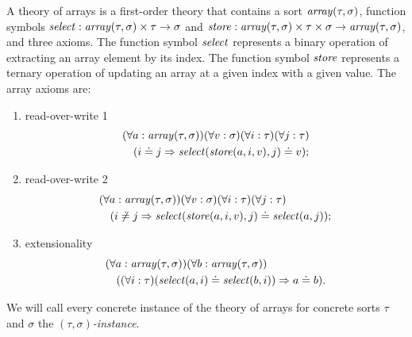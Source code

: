 A theory of arrays is a first-order theory that contains a sort
$\mathit{array}(\tau,\sigma)$, function symbols $\mathit{select} :
\mathit{array}(\tau,\sigma) \times \tau \to \sigma$ and $\mathit{store} :
\mathit{array}(\tau,\sigma) \times \tau \times \sigma \to
\mathit{array}(\tau,\sigma)$, and three axioms.
The function symbol $\mathit{select}$ represents a binary operation of
extracting an array element by its index.
The function symbol $\mathit{store}$ represents a ternary operation of updating an array at a given index with a given value. The array axioms are:
\begin{enumerate}
  \item read-over-write 1
        \begin{align*}
          &(\forall a:\mathit{array}(\tau,\sigma))(\forall v:\sigma)(\forall i:\tau)(\forall j:\tau)\\
          &\quad(i \doteq j \Rightarrow \mathit{select}({\mathit{store}({a},\allowbreak{i},\allowbreak{v})},\allowbreak{j}) \doteq v);
        \end{align*}
  \item read-over-write 2
        \begin{align*}
          &(\forall a:\mathit{array}(\tau,\sigma))(\forall v:\sigma)(\forall i:\tau)(\forall j:\tau)\\
          &\quad(i \not\doteq j \Rightarrow \mathit{select}({\mathit{store}({a},\allowbreak{i},\allowbreak{v})},\allowbreak{j}) \doteq \mathit{select}({a},\allowbreak{j}));
        \end{align*}
  \item extensionality
        \begin{align*}
          &(\forall a:\mathit{array}(\tau,\sigma))(\forall b:\mathit{array}(\tau,\sigma))\\
          &\quad((\forall i:\tau)(\mathit{select}({a},\allowbreak{i}) \doteq \mathit{select}({b},\allowbreak{i})) \Rightarrow a\doteq b).
        \end{align*}
\end{enumerate}
We will call every concrete instance of the theory of arrays for
concrete sorts $\tau$ and $\sigma$ the \emph{$(\tau,\sigma)$-instance}.


